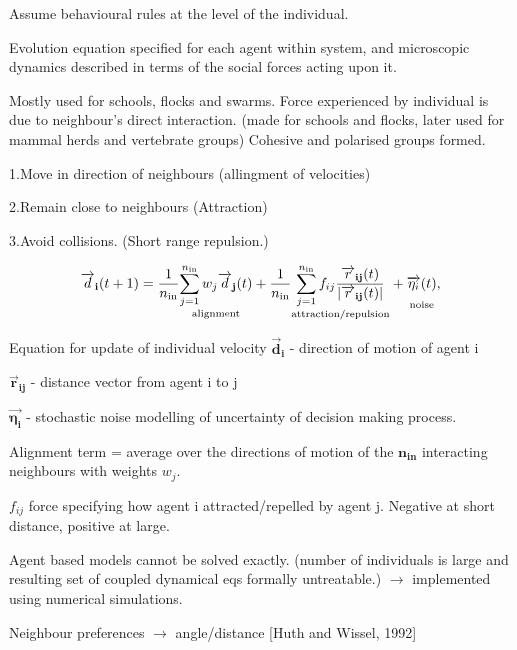 \documentclass[10pt,twocolumn]{revtex4-2}    %
\begin{document}
Assume behavioural rules at the level of the individual. 

Evolution equation specified for each agent within system, and microscopic dynamics described in terms of the social forces acting upon it. 

Mostly used for schools, flocks and swarms. 
Force experienced by individual is due to neighbour's direct interaction.
(made for schools and flocks, later used for mammal herds and vertebrate groups)
Cohesive and polarised groups formed.

    1.Move in direction of neighbours (allingment of velocities)


    2.Remain close to neighbours (Attraction)


    3.Avoid collisions. (Short range repulsion.)

\begin{equation}
\mathbf{\overrightarrow{d}_i}(t+1) = \frac{1}{n_{\text{in}}} \underset{\text{alignment}}{\sum_{j=1}^{n_{\text{in}}} w_j \mathbf{\overrightarrow{d}_j}(t) \vphantom{\frac{1}{n_{\text{in}}} \sum_{j=1}^{n_{\text{in}}}}}  
+ \frac{1}{n_{\text{in}}} \underset{\text{attraction/repulsion}}{\sum_{j=1}^{n_{\text{in}}} f_{ij} \frac{\mathbf{\overrightarrow{r}_{ij}}(t)}{\left|\mathbf{\overrightarrow{r}_{ij}}(t)\right|} \vphantom{\frac{1}{n_{\text{in}}}}} + \underset{{\text{noise}}}{\mathbf{\overrightarrow{\eta_i}}(t) \vphantom{\frac{1}{n_{\text{in}}}}},
\end{equation}

Equation for update of individual velocity
${\mathbf{\overrightarrow{d}_i}}$ - direction of motion of agent i

$\mathbf{\overrightarrow{r}_{ij}}$ - 
distance vector from agent i to j

$\mathbf{\overrightarrow{\eta_i}}$ -  stochastic noise modelling of uncertainty of decision making process. 

Alignment term = average over the directions of motion of the $\mathbf{n_{\text{in}}}$ interacting neighbours with weights $w_j$.

$f_{ij}$ force specifying how agent i attracted/repelled by agent j. Negative at short distance, positive at large.

Agent based models cannot be solved exactly. (number of individuals is large and resulting set of coupled dynamical eqs formally untreatable.) $\rightarrow$ implemented using numerical simulations. 

Neighbour preferences $\rightarrow$ angle/distance [Huth and Wissel, 1992]
\end{document}
